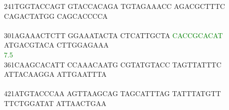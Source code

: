 \documentclass[11pt,twoside,reqno,a4paper]{article}
\begin{document}
{241\hspace*{1\charwidth}TGGTACCAGT	GTACCACAGA	TGTAGAAACC	AGACGCTTTC	CAGACTATGG	CAGCACCCCA	\\
\hspace*{4\charwidth}\hspace*{1\charwidth}\hspace*{1\charwidth}\hspace*{1\charwidth}\hspace*{1\charwidth}\hspace*{1\charwidth}\hspace*{1\charwidth}\\
301\hspace*{1\charwidth}AGAAACTCTT	GGAAATACTA	CTCATTGCTA	\textcolor{green}{C}\textcolor{green}{A}\textcolor{green}{C}\textcolor{green}{C}\textcolor{green}{G}\textcolor{green}{C}\textcolor{green}{A}\textcolor{green}{C}\textcolor{green}{A}\textcolor{green}{T}	ATGACGTACA	CTTGGAGAAA	\\
\hspace*{4\charwidth}\hspace*{1\charwidth}\hspace*{1\charwidth}\hspace*{1\charwidth}\hspace*{30\charwidth}\textcolor{green}{7.5}\hspace*{1\charwidth}\hspace*{1\charwidth}\hspace*{1\charwidth}\\
361\hspace*{1\charwidth}CAAGCACATT	CCAAACAATG	CGTATGTACC	TAGTTATTTC	ATTACAAGGA	ATTGAATTTA	\\
\hspace*{4\charwidth}\hspace*{1\charwidth}\hspace*{1\charwidth}\hspace*{1\charwidth}\hspace*{1\charwidth}\hspace*{1\charwidth}\hspace*{1\charwidth}\\
421\hspace*{1\charwidth}ATGTACCCAA	AGTTAAGCAG	TAGCATTTAG	TATTTATGTT	TTCTGGATAT	ATTAACTGAA	\\
\hspace*{4\charwidth}\hspace*{1\charwidth}\hspace*{1\charwidth}\hspace*{1\charwidth}\hspace*{1\charwidth}\hspace*{1\charwidth}\hspace*{1\charwidth}\\
}
\end{document}
